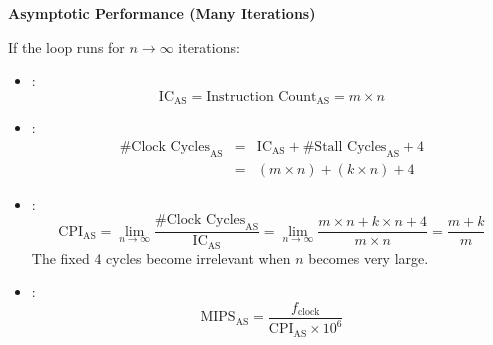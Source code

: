 \highspace
\begin{flushleft}
    \textcolor{Green3}{ \textbf{Asymptotic Performance (Many Iterations)}}
\end{flushleft}
If the loop runs for $n \rightarrow \infty$ iterations:
\begin{itemize}
    \item {}:
    \begin{equation}
        \text{IC}_{\text{AS}} = \text{Instruction Count}_{\text{AS}} = m \times n
    \end{equation}

    \item {}:
    \begin{equation}
        \begin{array}{rcl}
            \text{\# Clock Cycles}_{\text{AS}} &=& \text{IC}_{\text{AS}} + \text{\# Stall Cycles}_{\text{AS}} + 4 \\ [1em]
            &=& \left(m \times n\right) + \left(k \times n\right) + 4
        \end{array}
    \end{equation}

    \item {}:
    \begin{equation}
        \text{CPI}_{\text{AS}} = \lim_{n \to \infty} \dfrac{\text{\# Clock Cycles}_{\text{AS}}}{\text{IC}_{\text{AS}}} = \lim_{n \to \infty} \dfrac{m \times n + k \times n + 4}{m \times n} = \dfrac{m+k}{m}
    \end{equation}
    The fixed 4 cycles become irrelevant when $n$ becomes very large.

    \item {}:
    \begin{equation}
        \text{MIPS}_{\text{AS}} = \dfrac{f_{\text{clock}}}{\text{CPI}_{\text{AS}} \times 10^{6}}
    \end{equation}
\end{itemize}

